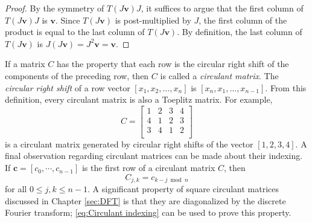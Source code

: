 \documentclass[12pt]{book}
\begin{document}
\begin{proof}
By the symmetry of $T(J\mathbf{v})J$, it suffices to argue that the first column of $T(J\mathbf{v})J$ is $\mathbf{v}$. Since $T(J\mathbf{v})$ is post-multiplied by $J$, the first column of the product is equal to the last column of $T(J\mathbf{v})$. By definition, the last column of $T(J\mathbf{v})$ is $J(J\mathbf{v}) = J^2\mathbf{v} = \mathbf{v}$.
\end{proof}
If a matrix $C$ has the property that each row is the circular right shift of the components of the preceding row, then $C$ is called a \textit{circulant matrix}. The \textit{circular right shift} of a row vector $[x_1,x_2,\ldots,x_n]$ is $[x_n,x_1,\ldots,x_{n-1}]$. From this definition, every circulant matrix is also a Toeplitz matrix. For example,
\[C = \begin{bmatrix}
1 & 2 & 3 & 4 \\
4 & 1 & 2 & 3 \\
3 & 4 & 1 & 2 \\
\end{bmatrix}\] 
is a circulant matrix generated by circular right shifts of the vector $[1,2,3,4]$. A final observation regarding circulant matrices can be made about their indexing. If $\mathbf{c} = [c_0,\cdots,c_{n-1}]$ is the first row of a circulant matrix $C$, then
\begin{equation}
\label{eq:Circulant indexing}
C_{j,k} = c_{k-j \bmod n}
\end{equation}
for all $0 \leq j,k \leq n-1$. A significant property of square circulant matrices discussed in Chapter \ref{sec:DFT} is that they are diagonalized by the discrete Fourier transform; \eqref{eq:Circulant indexing} can be used to prove this property.
\end{document}
